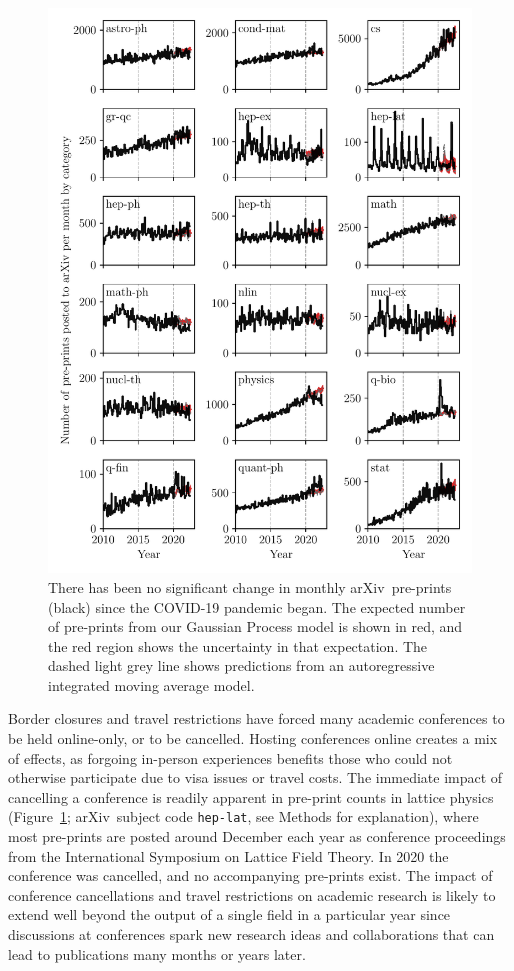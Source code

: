\documentclass[]{rsos}%
\newcommand{\arxiv}{arXiv}
\begin{document}
\begin{figure}[!h]
\includegraphics[width=0.95\linewidth]{pre-prints-segmented-by-field}
\caption{There has been no significant change in monthly \arxiv\ pre-prints (black) since the COVID-19 pandemic began. The expected number of pre-prints from our Gaussian Process model is shown in red, and the red region shows the uncertainty in that expectation. The dashed light grey line shows predictions from an autoregressive integrated moving average model.}
\label{fig:1}
\end{figure}



Border closures and travel restrictions have forced many academic conferences to be held online-only, or to be cancelled. Hosting conferences online creates a mix of effects, as forgoing in-person experiences benefits those who could not otherwise participate due to visa issues or travel costs\cite{Guinnessy:2021}. The immediate impact of cancelling a conference is readily apparent in pre-print counts in lattice physics (Figure~\ref{fig:1}; \arxiv\ subject code \texttt{hep-lat}, see Methods for explanation), where most pre-prints are posted around December each year as conference proceedings from the International Symposium on Lattice Field Theory. In 2020 the conference was cancelled\cite{LatticeConferenceWebsite}, and no accompanying pre-prints exist. The impact of conference cancellations and travel restrictions on academic research is likely to extend well beyond the output of a single field in a particular year since discussions at conferences spark new research ideas and collaborations that can lead to publications many months or years later\cite{Wang:2017}.
\end{document}
